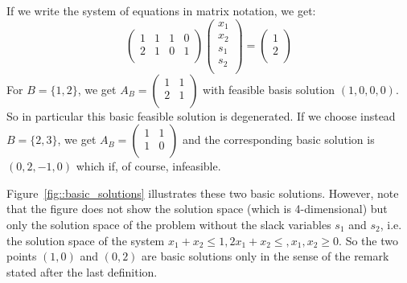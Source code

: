 \documentclass[12pt, showidx, twoside]{article}
\begin{document}
{{{If we write the system of equations in matrix notation, we get:
\[
\left(
\begin{array}{cccc}
  1 & 1 & 1 & 0\\
  2 & 1 & 0 & 1\\
\end{array}
\right)
\left(
   \begin{array}{c}
       x_1\\
       x_2\\
       s_1\\
       s_2\\
   \end{array}
\right)
= 
\left(
   \begin{array}{c}
       1\\
       2\\
   \end{array}
\right)
\] 
For $B=\{1,2\}$, we get $A_B = \left(\begin{array}{cc}
  1 & 1 \\
  2 & 1 \\
\end{array}\right)$
with feasible basis solution $(1,0,0,0)$. So in particular
this basic feasible solution is degenerated.
If we choose instead $B=\{2,3\}$, we get $A_B = \left(\begin{array}{cc}
  1 & 1 \\
  1 & 0 \\
\end{array}\right)$
and the corresponding basic solution is $(0,2,-1,0)$ which
if, of course, infeasible.

Figure~\ref{fig::basic_solutions} illustrates these two basic solutions.
However, note that the figure does not show the solution space (which
is 4-dimensional) but only the solution space of the 
problem without the slack variables $s_1$ and $s_2$,
i.e.\ 
the solution space of the system
$x_1 + x_2 \leq 1, 2x_1 + x_2 \leq , x_1,x_2 \geq 0$.
So the two points $(1,0)$ and $(0,2)$ are basic solutions only in the
sense of the remark stated after the last definition.


\begin{figure}[htb]
\begin{center}
\end{center}
\end{figure}}}}
\end{document}
